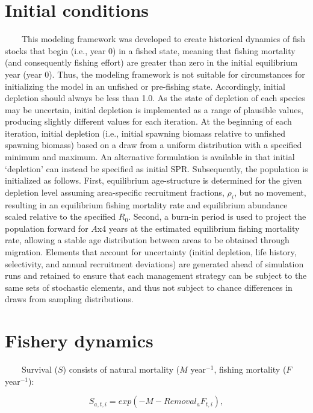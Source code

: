 \documentclass[
]{book}
\begin{document}
\section{Initial conditions}\label{initial-conditions}

~~~~This modeling framework was developed to create historical dynamics of fish stocks that begin (i.e., year 0) in a fished state, meaning that fishing mortality (and consequently fishing effort) are greater than zero in the initial equilibrium year (year 0). Thus, the modeling framework is not suitable for circumstances for initializing the model in an unfished or pre-fishing state. Accordingly, initial depletion should always be less than 1.0. As the state of depletion of each species may be uncertain, initial depletion is implemented as a range of plausible values, producing slightly different values for each iteration. At the beginning of each iteration, initial depletion (i.e., initial spawning biomass relative to unfished spawning biomass) based on a draw from a uniform distribution with a specified minimum and maximum. An alternative formulation is available in that initial `depletion' can instead be specified as initial SPR. Subsequently, the population is initialized as follows. First, equilibrium age-structure is determined for the given depletion level assuming area-specific recruitment fractions, \(\rho_i\), but no movement, resulting in an equilibrium fishing mortality rate and equilibrium abundance scaled relative to the specified \(R_0\). Second, a burn-in period is used to project the population forward for \(A\)x4 years at the estimated equilibrium fishing mortality rate, allowing a stable age distribution between areas to be obtained through migration. Elements that account for uncertainty (initial depletion, life history, selectivity, and annual recruitment deviations) are generated ahead of simulation runs and retained to ensure that each management strategy can be subject to the same sets of stochastic elements, and thus not subject to chance differences in draws from sampling distributions.

\section{Fishery dynamics}\label{fishery-dynamics}

~~~~Survival (\(S\)) consists of natural mortality (\(M\) year\(^{-1}\), fishing mortality (\(F\) year\(^{-1}\)):

\[
S_{a,t,i}=exp{\left(-M-{\mathit{Removal}}_aF_{t,i}\right)}, \tag{eq. 13} \label{eq:thirteenth} 
\]
\end{document}
